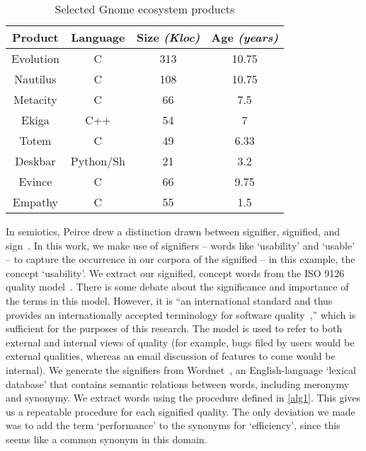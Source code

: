 \documentclass[conference, compsoc]{IEEEtran}
\begin{document}
\begin{table}
	\caption{Selected Gnome ecosystem products}
	\centering
	\label{tbl:projects}
\begin{tabular}{|c|c|c|c|}
\hline
\rowcolor[gray]{.9} 
\textbf{Product} & \textbf{Language} & \textbf{Size} \emph{(Kloc)} & \textbf{Age} \emph{(years)} \\
\hline
\hline 
Evolution & C & 313 & 10.75\\ \hline
Nautilus & C & 108 & 10.75  \\ \hline
Metacity & C & 66 & 7.5  \\ \hline
Ekiga & C++ & 54 & 7  \\ \hline
Totem & C & 49 & 6.33  \\ \hline
Deskbar & Python/Sh & 21 & 3.2  \\ \hline
Evince & C & 66 & 9.75\\ \hline
Empathy &C & 55 & 1.5\\ 
\hline
\end{tabular}
\end{table}

In semiotics, Peirce drew a distinction drawn between signifier, signified, and sign~\cite{atkin2006}. In this work, we make use of signifiers -- words like `usability' and `usable' -- to capture the occurrence in our corpora of the signified -- in this example, the concept `usability'. We extract our signified, concept words from the ISO 9126 quality model~\cite{iso9126}. There is some debate about the significance and importance of the terms in this model. However, it is ``an international standard and thus provides an internationally accepted terminology for software quality~\cite[p. 58]{Boegh2008},'' which is sufficient for the purposes of this research. The model is used to refer to both external and internal views of quality (for example, bugs filed by users would be external qualities, whereas an email discussion of features to come would be internal). We generate the signifiers from Wordnet~\cite{Fellbaum1998}, an English-language `lexical database' that contains semantic relations between words, including meronymy and synonymy. We extract words using the procedure defined in \ref{alg1}. This gives us a repeatable procedure for each signified quality. The only deviation we made was to add the term `performance' to the synonyms for `efficiency', since this seems like a common synonym in this domain.%
\end{document}
